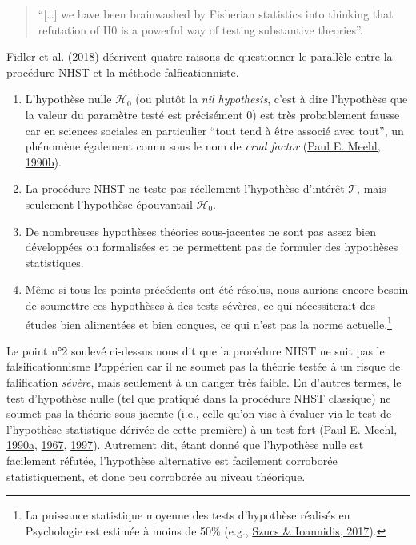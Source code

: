 \documentclass[
  a4paper,11pt,twoside,onecolumn,openright,final,oldfontcommands]{memoir}
\theoremstyle{definition}
\theoremstyle{definition}
\theoremstyle{definition}
\theoremstyle{definition}
\theoremstyle{remark}
\begin{document}
\begin{quote}
``{[}\ldots{]} we have been brainwashed by Fisherian statistics into thinking that refutation of H0 is a powerful way of testing substantive theories''.
\end{quote}

Fidler et al. (\protect\hyperlink{ref-fidler_epistemic_2018}{2018}) décrivent quatre raisons de questionner le parallèle entre la procédure NHST et la méthode falficationniste.

\begin{enumerate}
\def\labelenumi{\arabic{enumi}.}
\item
  L'hypothèse nulle \(\mathcal{H}_{0}\) (ou plutôt la \emph{nil hypothesis}, c'est à dire l'hypothèse que la valeur du paramètre testé est précisément \(0\)) est très probablement fausse car en sciences sociales en particulier ``tout tend à être associé avec tout'', un phénomène également connu sous le nom de \emph{crud factor} (\protect\hyperlink{ref-meehl_why_1990}{Paul E. Meehl, 1990b}).
\item
  La procédure NHST ne teste pas réellement l'hypothèse d'intérêt \(\mathcal{T}\), mais seulement l'hypothèse épouvantail \(\mathcal{H}_{0}\).
\item
  De nombreuses hypothèses théories sous-jacentes ne sont pas assez bien développées ou formalisées et ne permettent pas de formuler des hypothèses statistiques.
\item
  Même si tous les points précédents ont été résolus, nous aurions encore besoin de soumettre ces hypothèses à des tests sévères, ce qui nécessiterait des études bien alimentées et bien conçues, ce qui n'est pas la norme actuelle.\footnote{La puissance statistique moyenne des tests d'hypothèse réalisés en Psychologie est estimée à moins de 50\% (e.g., \protect\hyperlink{ref-szucs_empirical_2017-1}{Szucs \& Ioannidis, 2017}).}
\end{enumerate}

Le point n°2 soulevé ci-dessus nous dit que la procédure NHST ne suit pas le falsificationnisme Poppérien car il ne soumet pas la théorie testée à un risque de falification \emph{sévère}, mais seulement à un danger très faible. En d'autres termes, le test d'hypothèse nulle (tel que pratiqué dans la procédure NHST classique) ne soumet pas la théorie sous-jacente (i.e., celle qu'on vise à évaluer via le test de l'hypothèse statistique dérivée de cette première) à un test fort (\protect\hyperlink{ref-meehl_appraising_1990}{Paul E. Meehl, 1990a}, \protect\hyperlink{ref-meehl_theory-testing_1967}{1967}, \protect\hyperlink{ref-harlow_problem_1997}{1997}). Autrement dit, étant donné que l'hypothèse nulle est facilement réfutée, l'hypothèse alternative est facilement corroborée statistiquement, et donc peu corroborée au niveau théorique.
\end{document}
